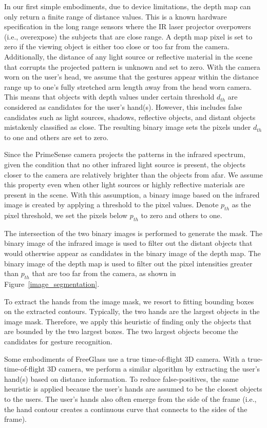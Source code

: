 In our first simple embodiments, due to device limitations, the depth map
can only return a finite range of distance values. This is a known hardware
specification in the long range sensors where the IR laser projector
overpowers (i.e., overexpose) the subjects that are close range. A depth map
pixel is set to zero if the viewing object is either too close or too far from
the camera. Additionally, the distance of any light source or reflective
material in the scene that corrupts the projected pattern is unknown and set
to zero. With the camera worn on the user's head, we assume that the gestures
appear within the distance range up to one's fully stretched arm length away
from the head worn camera. This means that objects with depth values under
certain threshold $d_{th}$ are considered as candidates for the user's hand(s).
However, this includes false candidates such as light sources, shadows,
reflective objects, and distant objects mistakenly classified as close.
The resulting binary image sets the pixels under $d_{th}$ to one and others
are set to zero.

Since the PrimeSense camera projects the patterns in the infrared spectrum,
given the condition that no other infrared light source is present,
the objects closer to the camera are relatively brighter than the objects
from afar. We assume this property even when other light sources or highly
reflective materials are present in the scene. With this assumption, a binary
image based on the infrared image is created by applying a threshold to the
pixel values. Denote $p_{th}$ as the pixel threshold, we set the pixels
below $p_{th}$ to zero and others to one.

The intersection of the two binary images is performed to generate the mask.
The binary image of the infrared image is used to filter out the distant
objects that would otherwise appear as candidates in the binary image of the
depth map.  The binary image of the depth map is used to filter out the
pixel intensities greater than $p_{th}$ that are too far from the camera,
as shown in Figure~\ref{image_segmentation}. 

To extract the hands from the image mask, we resort to fitting bounding boxes
on the extracted contours. Typically, the two hands are the largest objects in
the image mask. Therefore, we apply this heuristic of finding only the objects
that are bounded by the two largest boxes. The two largest objects become the
candidates for gesture recognition.

Some embodiments of FreeGlass use a true time-of-flight 3D camera.
With a true-time-of-flight 3D camera, we perform a similar algorithm by
extracting the user's hand(s) based on distance information. To reduce
false-positives, the same heuristic is applied because the user's hands are
assumed to be the closest objects to the users.  The user's hands also
often emerge from the side of the frame (i.e., the hand contour creates a
continuous curve that connects to the sides of the frame).

